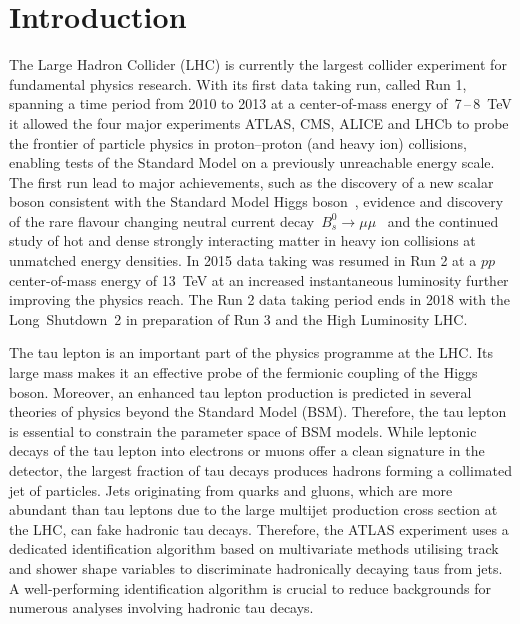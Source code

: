 \chapter*{Introduction}
\label{sec:intro}

The Large Hadron Collider (LHC) is currently the largest collider experiment for
fundamental physics research. With its first data taking run, called Run 1,
spanning a time period from 2010 to 2013 at a center-of-mass energy
of~\num{7}\,--\,\SI{8}{\TeV} it allowed the four major experiments ATLAS, CMS,
ALICE and LHCb to probe the frontier of particle physics in proton--proton (and
heavy ion) collisions, enabling tests of the Standard Model on a previously
unreachable energy scale. The first run lead to major achievements, such as the
discovery of a new scalar boson consistent with the Standard Model Higgs
boson~\cite{higgs_atlas, higgs_cms}, evidence and discovery of the rare flavour
changing neutral current decay~$B_s^0 \to \mu \mu$~\cite{lhcb_bs_mumu,
  cms_bs_mumu} and the continued study of hot and dense strongly interacting
matter in heavy ion collisions at unmatched energy densities. In 2015 data
taking was resumed in Run 2 at a $pp$ center-of-mass energy of \SI{13}{\TeV} at
an increased instantaneous luminosity further improving the physics reach. The
Run 2 data taking period ends in 2018 with the Long~Shutdown~2 in preparation of
Run 3 and the High Luminosity LHC.

The tau lepton is an important part of the physics programme at the LHC. Its
large mass makes it an effective probe of the fermionic coupling of the Higgs
boson. Moreover, an enhanced tau lepton production is predicted in several
theories of physics beyond the Standard Model (BSM). Therefore, the tau lepton
is essential to constrain the parameter space of BSM models. While leptonic
decays of the tau lepton into electrons or muons offer a clean signature in the
detector, the largest fraction of tau decays produces hadrons forming a
collimated jet of particles. Jets originating from quarks and gluons, which are
more abundant than tau leptons due to the large multijet production cross
section at the LHC, can fake hadronic tau decays. Therefore, the ATLAS
experiment uses a dedicated identification algorithm based on multivariate
methods utilising track and shower shape variables to discriminate hadronically
decaying taus from jets. A well-performing identification algorithm is crucial
to reduce backgrounds for numerous analyses involving hadronic tau decays.

